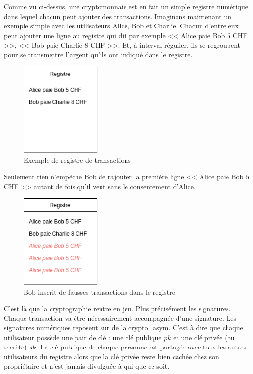 Comme vu ci-dessus, une cryptomonnaie est en fait un simple registre numérique dans lequel chacun peut ajouter des transactions. Imaginons maintenant un exemple simple avec les utilisateurs Alice, Bob et Charlie. Chacun d'entre eux peut ajouter une ligne au registre qui dit par exemple << Alice paie Bob 5 CHF >>, << Bob paie Charlie 8 CHF >>. Et, à interval régulier, ils se regroupent pour se transmettre l'argent qu'ils ont indiqué dans le registre.

\begin{figure}[H]
  \centering
  \includegraphics[width=4cm]{images/crypto_1.png}
  \caption{Exemple de registre de transactions}
\end{figure}

Seulement rien n'empêche Bob de rajouter la première ligne << Alice paie Bob 5 CHF >> autant de fois qu'il veut sans le consentement d'Alice.

\begin{figure}[H]
  \centering
  \includegraphics[width=4cm]{images/crypto_2.png}
  \caption{Bob inscrit de fausses transactions dans le registre}
\end{figure}

C'est là que la cryptographie rentre en jeu. Plus précisément les \glspl{signature}. Chaque transaction va être nécessairement accompagnée d'une signature. Les signatures numériques reposent sur de la \gls{crypto_asym}. C'est à dire que chaque utilisateur possède une pair de clé : une clé publique $pk$ et une clé privée (ou secrète) $sk$. La clé publique de chaque personne est partagée avec tous les autres utilisateurs du registre alors que la clé privée reste bien cachée chez son propriétaire et n'est jamais divulguée à qui que ce soit.

